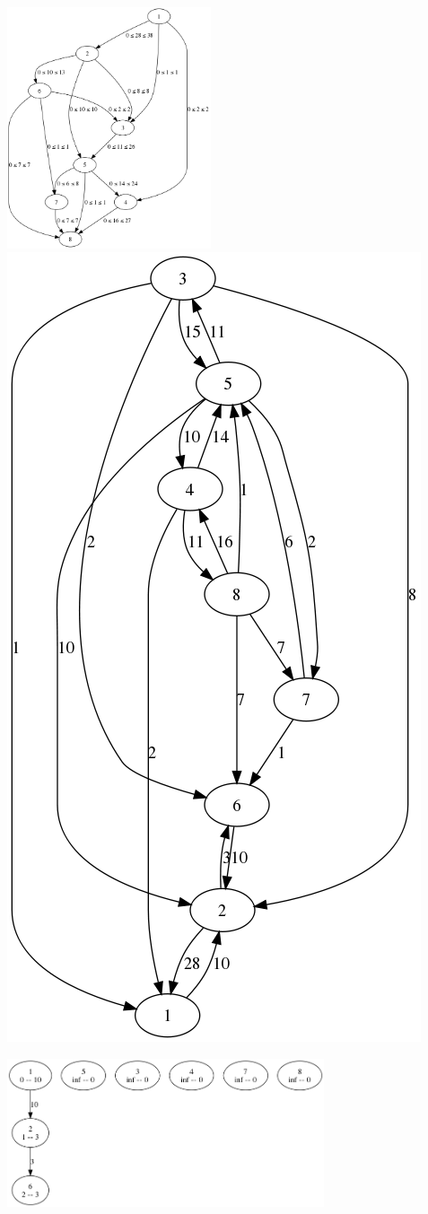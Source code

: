   \includegraphics[width=0.45\textwidth]{img/8-graph.png}
  \includegraphics[height=0.6\textwidth]{img/8-res-graph.png}
  
  \includegraphics[width=0.7\textwidth]{img/8-level-graph.png}
  
